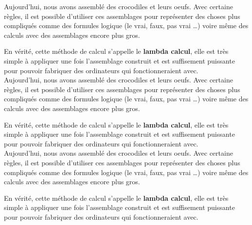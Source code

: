 \documentclass[french, a4paper, 11pt]{article}
\begin{document}
    Aujourd'hui, nous avons assemblé des crocodiles et leurs oeufs. Avec certaine règles, il est possible d'utiliser ces assemblages pour représenter des choses plus compliqués comme des formules logique (le vrai, faux, pas vrai \dots) voire même des calculs avec des assemblages encore plus gros.
    
    En vérité, cette méthode de calcul s'appelle le \textbf{lambda calcul}, elle est très simple à appliquer une fois l'assemblage construit et est suffisement puissante pour pouvoir fabriquer des ordinateurs qui fonctionneraient avec.\\

    Aujourd'hui, nous avons assemblé des crocodiles et leurs oeufs. Avec certaine règles, il est possible d'utiliser ces assemblages pour représenter des choses plus compliqués comme des formules logique (le vrai, faux, pas vrai \dots) voire même des calculs avec des assemblages encore plus gros.
    
    En vérité, cette méthode de calcul s'appelle le \textbf{lambda calcul}, elle est très simple à appliquer une fois l'assemblage construit et est suffisement puissante pour pouvoir fabriquer des ordinateurs qui fonctionneraient avec.\\

    Aujourd'hui, nous avons assemblé des crocodiles et leurs oeufs. Avec certaine règles, il est possible d'utiliser ces assemblages pour représenter des choses plus compliqués comme des formules logique (le vrai, faux, pas vrai \dots) voire même des calculs avec des assemblages encore plus gros.
    
    En vérité, cette méthode de calcul s'appelle le \textbf{lambda calcul}, elle est très simple à appliquer une fois l'assemblage construit et est suffisement puissante pour pouvoir fabriquer des ordinateurs qui fonctionneraient avec.\\
\end{document}
